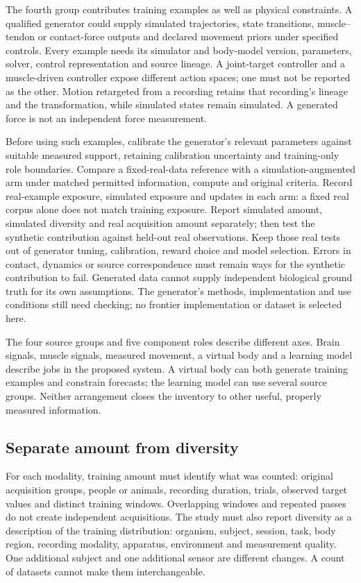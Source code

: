 The fourth group contributes training examples as well as physical constraints. A qualified generator could supply simulated trajectories, state transitions, muscle--tendon or contact-force outputs and declared movement priors under specified controls. Every example needs its simulator and body-model version, parameters, solver, control representation and source lineage. A joint-target controller and a muscle-driven controller expose different action spaces; one must not be reported as the other. Motion retargeted from a recording retains that recording's lineage and the transformation, while simulated states remain simulated. A generated force is not an independent force measurement.

Before using such examples, calibrate the generator's relevant parameters against suitable measured support, retaining calibration uncertainty and training-only role boundaries. Compare a fixed-real-data reference with a simulation-augmented arm under matched permitted information, compute and original criteria. Record real-example exposure, simulated exposure and updates in each arm: a fixed real corpus alone does not match training exposure. Report simulated amount, simulated diversity and real acquisition amount separately; then test the synthetic contribution against held-out real observations. Keep those real tests out of generator tuning, calibration, reward choice and model selection. Errors in contact, dynamics or source correspondence must remain ways for the synthetic contribution to fail. Generated data cannot supply independent biological ground truth for its own assumptions. The generator's methods, implementation and use conditions still need checking; no frontier implementation or dataset is selected here.

The four source groups and five component roles describe different axes. Brain signals, muscle signals, measured movement, a virtual body and a learning model describe jobs in the proposed system. A virtual body can both generate training examples and constrain forecasts; the learning model can use several source groups. Neither arrangement closes the inventory to other useful, properly measured information.

\subsection{Separate amount from diversity}

For each modality, training amount must identify what was counted: original acquisition groups, people or animals, recording duration, trials, observed target values and distinct training windows. Overlapping windows and repeated passes do not create independent acquisitions. The study must also report diversity as a description of the training distribution: organism, subject, session, task, body region, recording modality, apparatus, environment and measurement quality. One additional subject and one additional sensor are different changes. A count of datasets cannot make them interchangeable.

